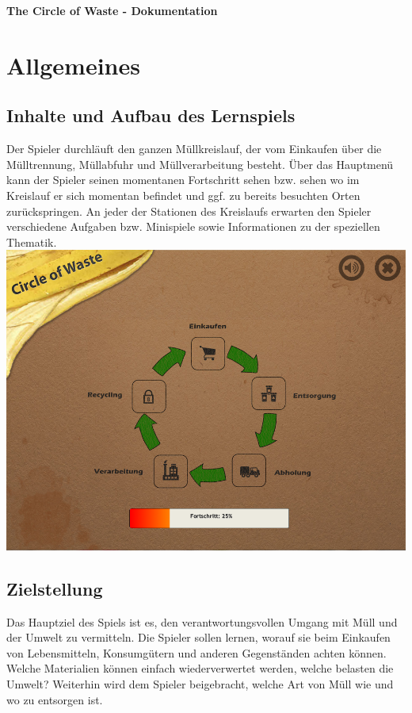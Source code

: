 \documentclass[a4paper]{article}
\newcommand{\changefont}[3]{
\fontfamily{#1} \fontseries{#2} \fontshape{#3} \selectfont}
\begin{document}
\changefont{cmss}{m}{n} %

\begin{center}
\textbf{\Large The Circle of Waste - Dokumentation}
\end{center}

\vspace{5mm}



\tableofcontents

\pagebreak

\section{Allgemeines}
    \subsection{Inhalte und Aufbau des Lernspiels}
        Der Spieler durchläuft den ganzen Müllkreislauf, der vom Einkaufen über die Mülltrennung, Müllabfuhr und Müllverarbeitung besteht. Über das Hauptmenü kann der Spieler seinen momentanen Fortschritt sehen bzw. sehen wo im Kreislauf er sich momentan befindet und ggf. zu bereits besuchten Orten zurückspringen. An jeder der Stationen des Kreislaufs erwarten den Spieler verschiedene Aufgaben bzw. Minispiele sowie Informationen zu der speziellen Thematik.\\

    \includegraphics[width=\linewidth]{tcw.png}

    \subsection{Zielstellung}
        Das Hauptziel des Spiels ist es, den verantwortungsvollen Umgang mit Müll und der Umwelt zu vermitteln. Die Spieler sollen lernen, worauf sie beim Einkaufen von Lebensmitteln, Konsumgütern und anderen Gegenständen achten können. Welche Materialien können einfach wiederverwertet werden, welche belasten die Umwelt? Weiterhin wird dem Spieler beigebracht, welche Art von Müll wie und wo zu entsorgen ist.
\end{document}
